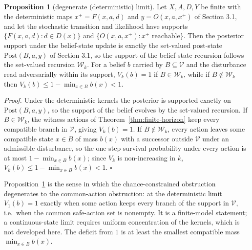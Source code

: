 \documentclass[10pt,twocolumn]{article}
\theoremstyle{definition}
\newtheorem{proposition}{Proposition}
\begin{document}
\begin{proposition}[degenerate (deterministic) limit]\label{prop:degenerate}
Let \(X, A, D, Y\) be finite with the deterministic maps \(x^{+} = F(x,a,d)\) and \(y = O(x,a,x^{+})\) of Section 3.1, and let the stochastic transition and likelihood have supports \(\{F(x,a,d) : d \in D(x)\}\) and \(\{O(x,a,x^{+}) : x^{+} \text{ reachable}\}\). Then the posterior support under the belief-state update is exactly the set-valued post-state \(\mathrm{Post}(B,a,y)\) of Section 3.1, so the support of the belief-state recursion follows the set-valued recursion \(\mathcal{W}_{k}\). For a belief \(b\) carried by \(B \subseteq \mathcal{V}\) and the disturbance read adversarially within its support, \(V_{k}(b) = 1\) if \(B \in \mathcal{W}_{k}\), while if \(B \notin \mathcal{W}_{k}\) then \(V_{k}(b) \le 1 - \min_{x \in B} b(x) < 1\).
\end{proposition}

\emph{Proof.} Under the deterministic kernels the posterior is supported exactly on \(\mathrm{Post}(B,a,y)\), so the support of the belief evolves by the set-valued recursion. If \(B \in \mathcal{W}_{k}\), the witness actions of Theorem~\ref{thm:finite-horizon} keep every compatible branch in \(\mathcal{V}\), giving \(V_{k}(b) = 1\). If \(B \notin \mathcal{W}_{k}\), every action leaves some compatible state \(x \in B\) of mass \(b(x)\) with a successor outside \(\mathcal{V}\) under an admissible disturbance, so the one-step survival probability under every action is at most \(1 - \min_{x \in B} b(x)\); since \(V_{k}\) is non-increasing in \(k\), \(V_{k}(b) \le 1 - \min_{x \in B} b(x) < 1\). \hfill\(\square\)

Proposition~\ref{prop:degenerate} is the sense in which the chance-constrained obstruction degenerates to the common-action obstruction: at the deterministic limit \(V_{1}(b) = 1\) exactly when some action keeps every branch of the support in \(\mathcal{V}\), i.e.\ when the common safe-action set is nonempty. It is a finite-model statement; a continuous-state limit requires uniform concentration of the kernels, which is not developed here. The deficit from \(1\) is at least the smallest compatible mass \(\min_{x \in B} b(x)\).
\end{document}
